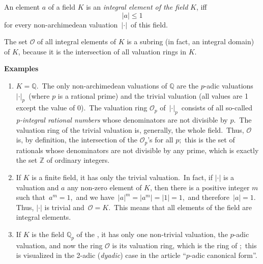 \documentclass[12pt]{article}
\begin{document}
An element $a$ of a field $K$ is an {\em integral element of the field} $K$, iff    
                         $$|a| \leq 1$$
for every non-archimedean valuation\, $|\cdot|$\, of this field.

The set $\mathcal{O}$ of all integral elements of $K$ is a subring (in fact, an integral domain) of $K$, because it is the intersection of all valuation rings in $K$.

\textbf{Examples}
\begin{enumerate}

 \item $K = \mathbb{Q}$.\, The only non-archimedean valuations of $\mathbb{Q}$ are the $p$-adic valuations\, $|\cdot|_p$\, (where $p$ is a rational prime) and the trivial valuation (all values are 1 except the value of 0).\, The valuation ring $\mathcal{O}_p$ of\, $|\cdot|_p$\, consists of all so-called {\em p-integral rational numbers} whose denominators are not divisible by $p$.\, The valuation ring of the trivial valuation is, generally, the whole field.\, Thus, $\mathcal{O}$ is, by definition, the intersection of the $\mathcal{O}_p$'s for all $p$;\, this is the set of rationals whose denominators are not divisible by any prime, which is exactly the set $\mathbb{Z}$ of ordinary integers.

 \item If $K$ is a finite field, it has only the trivial valuation.\, In fact, if $|\cdot|$ is a valuation and $a$ any non-zero element of $K$, then there is a positive integer $m$ such that\, $a^m = 1$,\, and we have\, $|a|^m = |a^m| = |1| = 1$,\, and therefore\, $|a| = 1$.\, Thus, $|\cdot|$ is trivial and\, $\mathcal{O} = K$.\, This means that all elements of the field are integral elements.

 \item If $K$ is the field $\mathbb{Q}_p$ of the , it has only one non-trivial valuation, the $p$-adic valuation, and now the ring $\mathcal{O}$ is its valuation ring, which is the ring of ;\, this is visualized in the 2-adic ({\em dyadic}) case in the article ``$p$-adic canonical form''. 

\end{enumerate}
\end{document}
